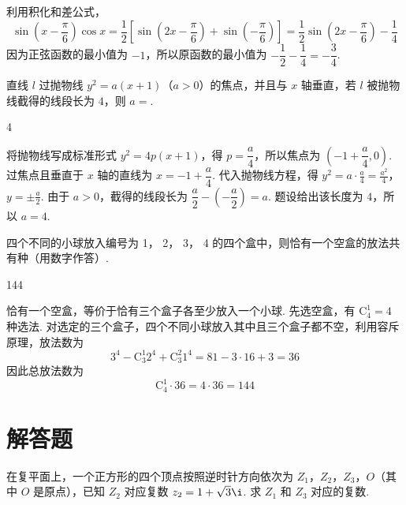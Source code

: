 \documentclass[UTF8,a4paper,oneside,11pt]{ctexbook}
\begin{document}
\begin{solution}
利用积化和差公式，
\[
\sin\left(x-\frac{\pi}{6}\right)\cos x
=\frac12\left[\sin\left(2x-\frac{\pi}{6}\right)+\sin\left(-\frac{\pi}{6}\right)\right]
=\frac12\sin\left(2x-\frac{\pi}{6}\right)-\frac14
\]
因为正弦函数的最小值为 \(-1\)，所以原函数的最小值为 \(-\dfrac12-\dfrac14=-\dfrac34\).
\end{solution}

\begin{problem}
直线 \(l\) 过抛物线 \(y^{2} = a(x + 1)\)（\(a > 0\)）的焦点，并且与 \(x\) 轴垂直，若 \(l\) 被抛物线截得的线段长为 \(4\)，则 \(a = \)\fillinblank{}.
\end{problem}

\begin{answer}
4
\end{answer}

\begin{solution}
将抛物线写成标准形式 \(y^2=4p(x+1)\)，得 \(p=\dfrac a4\)，所以焦点为 \(\left(-1+\dfrac a4,0\right)\). 过焦点且垂直于 \(x\) 轴的直线为 \(x=-1+\dfrac a4\). 代入抛物线方程，得
\(y^2=a\cdot\frac a4=\frac{a^2}{4}\)，\(y=\pm\frac a2\).
由于 \(a>0\)，截得的线段长为 \(\dfrac a2-\left(-\dfrac a2\right)=a\). 题设给出该长度为 \(4\)，所以 \(a=4\).
\end{solution}

\begin{problem}
四个不同的小球放入编号为 1， 2， 3， 4 的四个盒中，则恰有一个空盒的放法共有\fillinblank{}种（用数字作答）.
\end{problem}

\begin{answer}
144
\end{answer}

\begin{solution}
恰有一个空盒，等价于恰有三个盒子各至少放入一个小球. 先选空盒，有 \(\mathrm C_4^1=4\) 种选法. 对选定的三个盒子，四个不同小球放入其中且三个盒子都不空，利用容斥原理，放法数为
\[
3^4-\mathrm C_3^1 2^4+\mathrm C_3^2 1^4
=81-3\cdot16+3=36
\]
因此总放法数为
\[
\mathrm C_4^1\cdot36=4\cdot36=144
\]
\end{solution}

\section{解答题}

\begin{problem}
在复平面上，一个正方形的四个顶点按照逆时针方向依次为 \(Z_{1}\)，\(Z_{2}\)，\(Z_{3}\)，\(O\)（其中 \(O\) 是原点），已知 \(Z_{2}\) 对应复数 \(z_{2} = 1 + \sqrt{3} \i\). 求 \(Z_{1}\) 和 \(Z_{3}\) 对应的复数.
\end{problem}
\end{document}
